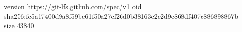 version https://git-lfs.github.com/spec/v1
oid sha256:fc5a17400d9a8f59bc61f50a27cf26d0b38163c2c2d9c868df407c886898867b
size 43840
